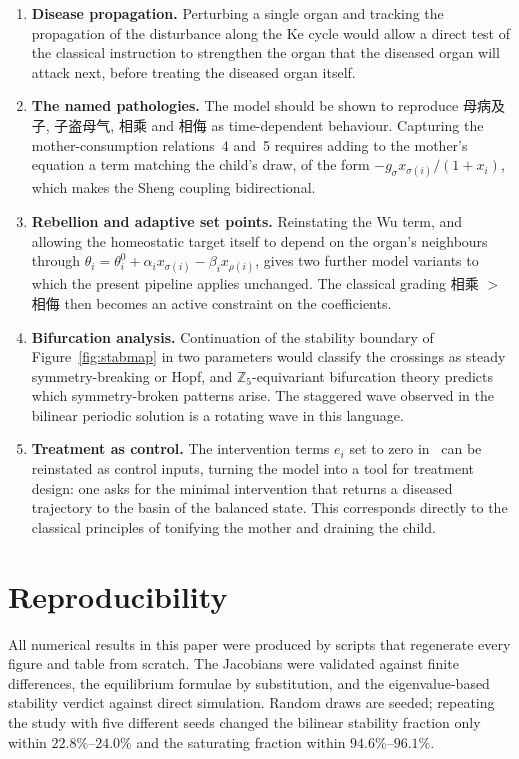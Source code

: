 \documentclass[11pt]{article}
\newcommand{\Z}{{\mathbb{Z}}}
\begin{document}
\begin{enumerate}
\item \textbf{Disease propagation.} Perturbing a single organ and tracking the
propagation of the disturbance along the Ke cycle would allow a direct test of
the classical instruction to strengthen the organ that the diseased organ will
attack next, before treating the diseased organ itself.

\item \textbf{The named pathologies.} The model should be shown to reproduce
母病及子, 子盗母气, 相乘 and 相侮 as time-dependent behaviour. Capturing the
mother-consumption relations~4 and~5 requires adding to the mother's equation a
term matching the child's draw, of the form $-g_{\sigma}x_{\sigma(i)}/(1+x_i)$,
which makes the Sheng coupling bidirectional.

\item \textbf{Rebellion and adaptive set points.} Reinstating the Wu term, and
allowing the homeostatic target itself to depend on the organ's neighbours
through $\theta_i=\theta_i^0+\alpha_i x_{\sigma(i)}-\beta_i x_{\rho(i)}$, gives
two further model variants to which the present pipeline applies unchanged. The
classical grading 相乘 $>$ 相侮 then becomes an active constraint on the
coefficients.

\item \textbf{Bifurcation analysis.} Continuation of the stability boundary of
Figure~\ref{fig:stabmap} in two parameters would classify the crossings as steady
symmetry-breaking or Hopf, and $\Z_5$-equivariant bifurcation theory predicts
which symmetry-broken patterns arise. The staggered wave observed in the bilinear
periodic solution is a rotating wave in this language.

\item \textbf{Treatment as control.} The intervention terms $e_i$ set to zero
in~\cite{Lin2020} can be reinstated as control inputs, turning the model into a
tool for treatment design: one asks for the minimal intervention that returns a
diseased trajectory to the basin of the balanced state. This corresponds directly
to the classical principles of tonifying the mother and draining the child.
\end{enumerate}

\section*{Reproducibility}

All numerical results in this paper were produced by scripts that regenerate
every figure and table from scratch. The Jacobians were validated against finite
differences, the equilibrium formulae by substitution, and the eigenvalue-based
stability verdict against direct simulation. Random draws are seeded; repeating
the study with five different seeds changed the bilinear stability fraction only
within $22.8\%$--$24.0\%$ and the saturating fraction within $94.6\%$--$96.1\%$.

\printbibliography
\end{document}
